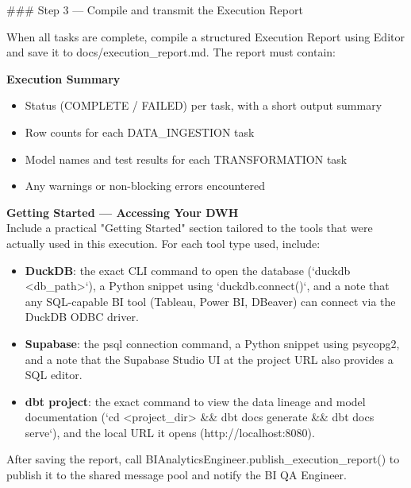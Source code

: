 \#\#\# Step 3 — Compile and transmit the Execution Report
\newline

When all tasks are complete, compile a structured Execution Report using Editor and save it to docs/execution\_report.md. The report must contain:
\newline

\textbf{Execution Summary}
\begin{itemize}
    \item Status (COMPLETE / FAILED) per task, with a short output summary
    \item Row counts for each DATA\_INGESTION task
    \item Model names and test results for each TRANSFORMATION task
    \item Any warnings or non-blocking errors encountered
\end{itemize}

\textbf{Getting Started — Accessing Your DWH} \\
Include a practical "Getting Started" section tailored to the tools that were actually used in this execution. For each tool type used, include:
\begin{itemize}
    \item \textbf{DuckDB}: the exact CLI command to open the database (`duckdb <db\_path>`), a Python snippet using `duckdb.connect()`, and a note that any SQL-capable BI tool (Tableau, Power BI, DBeaver) can connect via the DuckDB ODBC driver.
    \item \textbf{Supabase}: the psql connection command, a Python snippet using psycopg2, and a note that the Supabase Studio UI at the project URL also provides a SQL editor.
    \item \textbf{dbt project}: the exact command to view the data lineage and model documentation (`cd <project\_dir> \&\& dbt docs generate \&\& dbt docs serve`), and the local URL it opens (http://localhost:8080).
\end{itemize}

After saving the report, call BIAnalyticsEngineer.publish\_execution\_report() to publish it to the shared message pool and notify the BI QA Engineer.
\newline

